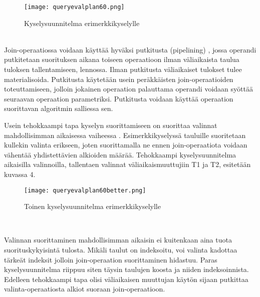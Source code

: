 \documentclass[finnish]{tktltiki2}
\theoremstyle{definition}
\theoremstyle{remark}
\begin{document}
\begin{figure}[!h] 
  \caption{Kyselysuunnitelma erimerkkikyselylle}
  \centering
    \texttt{[image: queryevalplan60.png]}
\end{figure}
\\\newline
Join-operaatiossa voidaan käyttää hyväksi putkitusta (pipelining) \cite{dalvi2001pipelining}, jossa operandi putkitetaan suorituksen aikana toiseen operaatioon ilman väliaikaista taulua tuloksen tallentamiseen, lennossa. Ilman putkitusta väliaikaiset tulokset tulee materialisoida. Putkitusta käytetään usein peräkkäisten join-operaatioiden toteuttamiseen, jolloin jokainen operaation palauttama operandi voidaan syöttää seuraavan operaation parametriksi. Putkitusta voidaan käyttää operaation suorittavan algoritmin salliessa sen.

Usein tehokkaampi tapa kyselyn suorittamiseen on suorittaa valinnat mahdollisimman aikaisessa vaiheessa \cite{ramakrishnan2003database}. Esimerkkikyselyssä tauluille suoritetaan kullekin valinta erikseen, joten suorittamalla ne ennen join-operaatiota voidaan vähentää yhdistettävien alkioiden määrää. Tehokkaampi kyselysuunnitelma aikaisilla valinnoilla, tallentaen valinnat väliaikaismuuttujiin T1 ja T2, esitetään kuvassa 4.

 \begin{figure}[!h] %
  \caption{Toinen kyselysuunnitelma erimerkkikyselylle}
  \centering
    \texttt{[image: queryevalplan60better.png]}
\end{figure}
\\\newline
%

Valinnan suorittaminen mahdollisimman aikaisin ei kuitenkaan aina tuota suorituskykyisintä tulosta. \cite{ramakrishnan2003database} Mikäli taulut on indeksoitu, voi valinta kadottaa tärkeät indeksit jolloin join-operaation suorittaminen hidastuu. Paras kyselysuunnitelma riippuu siten täysin taulujen koosta ja niiden indeksoinnista. Edelleen tehokkaampi tapa olisi väliaikaisen muuttujan käytön sijaan putkittaa valinta-operaatiosta alkiot suoraan join-operaatioon.
\end{document}
